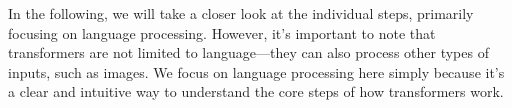 





\noindent
In the following, we will take a closer look at the individual steps, primarily focusing on 
language processing. However, it's important to note that transformers are not limited to 
language—they can also process other types of inputs, such as images. We focus on language 
processing here simply because it's a clear and intuitive way to understand the core steps 
of how transformers work.

